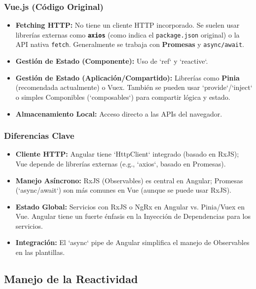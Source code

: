\documentclass[11pt, a4paper]{article}
\begin{document}
\subsubsection{Vue.js (Código Original)}
\begin{itemize}
    \item \textbf{Fetching HTTP:} No tiene un cliente HTTP incorporado. Se suelen usar librerías externas como \textbf{\texttt{axios}} (como indica el \texttt{package.json} original) o la API nativa \texttt{fetch}. Generalmente se trabaja con \textbf{Promesas} y \texttt{async/await}.
    \item \textbf{Gestión de Estado (Componente):} Uso de `ref` y `reactive`.
    \item \textbf{Gestión de Estado (Aplicación/Compartido):} Librerías como \textbf{Pinia} (recomendada actualmente) o Vuex. También se pueden usar `provide`/`inject` o simples Componibles (`composables`) para compartir lógica y estado.
    \item \textbf{Almacenamiento Local:} Acceso directo a las APIs del navegador.
\end{itemize}

\subsubsection{Diferencias Clave}
\begin{itemize}
    \item \textbf{Cliente HTTP:} Angular tiene `HttpClient` integrado (basado en RxJS); Vue depende de librerías externas (e.g., `axios`, basado en Promesas).
    \item \textbf{Manejo Asíncrono:} RxJS (Observables) es central en Angular; Promesas (`async/await`) son más comunes en Vue (aunque se puede usar RxJS).
    \item \textbf{Estado Global:} Servicios con RxJS o NgRx en Angular vs. Pinia/Vuex en Vue. Angular tiene un fuerte énfasis en la Inyección de Dependencias para los servicios.
    \item \textbf{Integración:} El `async` pipe de Angular simplifica el manejo de Observables en las plantillas.
\end{itemize}

\subsection{Manejo de la Reactividad}
\end{document}
